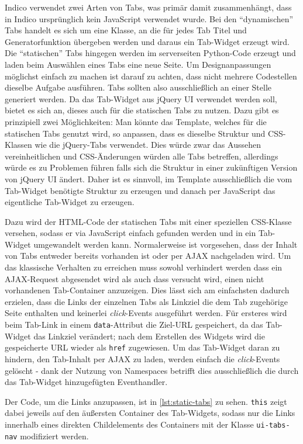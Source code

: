 Indico verwendet zwei Arten von Tabs, was primär damit zusammenhängt, dass in Indico ursprünglich
kein JavaScript verwendet wurde. Bei den \enquote{dynamischen} Tabs handelt es sich um eine Klasse,
an die für jedes Tab Titel und Generatorfunktion übergeben werden und daraus ein Tab-Widget erzeugt
wird. Die \enquote{statischen} Tabs hingegen werden im serverseiten Python-Code erzeugt und laden
beim Auswählen eines Tabs eine neue Seite. Um Designanpassungen möglichst einfach zu machen ist
darauf zu achten, dass nicht mehrere Codestellen dieselbe Aufgabe ausführen. Tabs sollten
also ausschließlich an einer Stelle generiert werden. Da das Tab-Widget aus jQuery UI verwendet
werden soll, bietet es sich an, dieses auch für die statischen Tabs zu nutzen. Dazu gibt es
prinzipiell zwei Möglichkeiten: Man könnte das Template, welches für die statischen Tabs genutzt
wird, so anpassen, dass es dieselbe Struktur und CSS-Klassen wie die jQuery-Tabs verwendet. Dies
würde zwar das Aussehen vereinheitlichen und CSS-Änderungen würden alle Tabs betreffen, allerdings
würde es zu Problemen führen falls sich die Struktur in einer zukünftigen Version von jQuery UI
ändert. Daher ist es sinnvoll, im Template ausschließlich die vom Tab-Widget benötigte Struktur zu
erzeugen und danach per JavaScript das eigentliche Tab-Widget zu erzeugen.

Dazu wird der HTML-Code der statischen Tabs mit einer speziellen CSS-Klasse versehen, sodass er via
JavaScript einfach gefunden werden und in ein Tab-Widget umgewandelt werden kann. Normalerweise ist
vorgesehen, dass der Inhalt von Tabs entweder bereits vorhanden ist oder per AJAX nachgeladen wird.
Um das klassische Verhalten zu erreichen muss sowohl verhindert werden dass ein AJAX-Request
abgesendet wird als auch dass versucht wird, einen nicht vorhandenen Tab-Container anzuzeigen. Dies
lässt sich am einfachsten dadurch erzielen, dass die Links der einzelnen Tabs als Linkziel die dem
Tab zugehörige Seite enthalten und keinerlei \emph{click}-Events ausgeführt werden. Für ersteres
wird beim Tab-Link in einem \lstinline{data}-Attribut die Ziel-URL gespeichert, da das Tab-Widget
das Linkziel verändert; nach dem Erstellen des Widgets wird die gespeicherte URL wieder als
\lstinline{href} zugewiesen. Um das Tab-Widget daran zu hindern, den Tab-Inhalt per AJAX zu laden,
werden einfach die \emph{click}-Events gelöscht - dank der Nutzung von Namespaces betrifft dies
ausschließlich die durch das Tab-Widget hinzugefügten Eventhandler.

Der Code, um die Links anzupassen, ist in \autoref{lst:static-tabs} zu sehen. \lstinline{this} zeigt
dabei jeweils auf den äußersten Container des Tab-Widgets, sodass nur die Links innerhalb eines
direkten Childelements des Containers mit der Klasse \lstinline{ui-tabs-nav} modifiziert werden.

